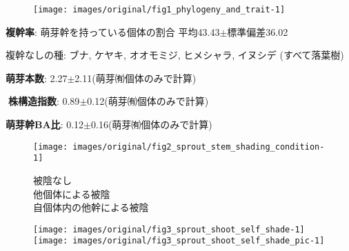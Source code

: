 \documentclass[a0, 30pt, plainboxedsections]{sciposter} %
\begin{document}
\begin{multicols}{2}

\begin{mdframed}[style=subsection.frame,frametitle={\textbf{\huge{\ding{192}}\LARGE{25種の株構造は種間で大きく異なる}}}]

\vspace{-1.0em}
\begin{figure}
  \centering
    \texttt{[image: images/original/fig1\_phylogeny\_and\_trait-1]}
\end{figure}

\vspace{-1em}
\faCaretRight \textbf{複幹率}{\small: 萌芽幹を持っている個体の割合} 平均43.43$\pm$標準偏差36.02


{\small
\hspace*{4.5em}複幹なしの種: ブナ, ケヤキ, オオモミジ, ヒメシャラ, イヌシデ (すべて落葉樹)

}

\faCaretRight \textbf{萌芽本数}: 2.27$\pm$2.11{\small(萌芽㈲個体のみで計算)}

\faCaretRight \textbf{株構造指数}: 0.89$\pm$0.12{\small(萌芽㈲個体のみで計算)}


\faCaretRight \textbf{萌芽幹BA比}: 0.12$\pm$0.16{\small(萌芽㈲個体のみで計算)}

\end{mdframed}

\begin{mdframed}[style=subsection.frame,frametitle=\textbf{\huge{\ding{194}}\LARGE{萌芽性が強い種ほど自己被陰率が下がる}}]

\vspace{-0.5em}
\begin{figure}
 \begin{minipage}{0.25\hsize}
  \centering
   \texttt{[image: images/original/fig2\_sprout\_stem\_shading\_condition-1]}
   
  \vspace{-0.4em}\flushleft 
    {\tiny \textcolor[HTML]{4D4D4D}{\faStop} 被陰なし\\
    \textcolor[HTML]{C0C0C0}{\faStop} 他個体による被陰\\
    \vspace{-1.6em}\textcolor[HTML]{FFFFFF}{\faStop} 自個体内の他幹による被陰}
 \end{minipage}
 \begin{minipage}{0.75\hsize}
  \centering
   \texttt{[image: images/original/fig3\_sprout\_shoot\_self\_shade-1]}
   \texttt{[image: images/original/fig3\_sprout\_shoot\_self\_shade\_pic-1]}
   

\end{minipage}
\end{figure}
\end{mdframed}
\end{multicols}
\end{document}
